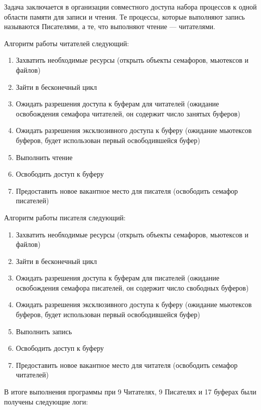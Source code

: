 \documentclass[a4paper,14pt]{extarticle}
\begin{document}
Задача заключается в организации совместного доступа набора процессов к одной
области памяти для записи и чтения. Те процессы, которые выполняют запись
называются Писателями, а те, что выполняют чтение --- читателями.

Алгоритм работы читателей следующий:
\begin{enumerate}
    \item Захватить необходимые ресурсы (открыть объекты семафоров, мьютексов и
        файлов)
    \item Зайти в бесконечный цикл
    \item Ожидать разрешения доступа к буферам для читателей (ожидание
        освобождения семафора читателей, он содержит число занятых буферов)
    \item Ожидать разрешения эксклюзивного доступа к буферу (ожидание мьютексов
        буферов, будет использован первый освободившейся буфер)
    \item Выполнить чтение
    \item Освободить доступ к буферу
    \item Предоставить новое вакантное место для писателя
        (освободить семафор писателей)
\end{enumerate}

Алгоритм работы писателя следующий:
\begin{enumerate}
    \item Захватить необходимые ресурсы (открыть объекты семафоров, мьютексов и
        файлов)
    \item Зайти в бесконечный цикл
    \item Ожидать разрешения доступа к буферам для писателей (ожидание
        освобождения семафора писателей, он содержит число свободных буферов)
    \item Ожидать разрешения эксклюзивного доступа к буферу (ожидание мьютексов
        буферов, будет использован первый освободившейся буфер)
    \item Выполнить запись
    \item Освободить доступ к буферу
    \item Предоставить новое вакантное место для читателя
        (освободить семафор читателей)
\end{enumerate}

В итоге выполнения программы при 9 Читателях, 9 Писателях и 17 буферах были
получены следующие логи:

\end{document}
